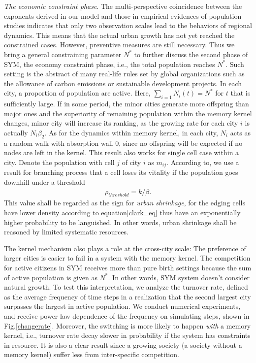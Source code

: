 \documentclass[reprint,unsortedaddress,amsmath,amssymb,aps,prl,showkeys]{revtex4-2}
\begin{document}
\textit{The economic constraint phase}. The multi-perspective coincidence between the exponents derived in our model and those in empirical evidences of population studies indicates that only two observation scales lead to the behaviors of regional dynamics. This means that the actual urban growth has not yet reached the constrained cases. However, preventive measures are still necessary. Thus we bring a general constraining parameter $N^*$ to further discuss the second phase of SYM, the economy constraint phase, i.e., the total population reaches $N^*$. Such setting is the abstract of many real-life rules set by global organizations such as the allowance of carbon emissions or sustainable development projects. In each city, a proportion of population are active. Here, $\sum_{i=1} N_i(t) = N^*$ for $t$ that is sufficiently large. If in some period, the minor cities generate more offspring than major ones and the superiority of remaining population within the memory kernel changes, minor city will increase its ranking, as the growing rate for each city $i$ is actually $N_i\beta_2$. As for the dynamics within memory kernel, in each city, $N_i$ acts as a random walk with absorption wall $0$, since no offspring will be expected if no nodes are left in the kernel. This result also works for single cell case within a city. Denote the population with cell $j$ of city $i$ as $m_{ij}$. According to\@\cite{durrett1999essentials}, we use a result for branching process that a cell loses its vitality if the population goes downhill under a threshold \begin{align}\rho_{threshold} = k/\beta.\end{align} This value shall be regarded as the sign for \emph{urban shrinkage}, for the edging cells have lower density according to equation\@\ref{clark_eq} thus have an exponentially higher probability to be languished. In other words, urban shrinkage shall be reasoned by limited systematic resources. 

The kernel mechanism also plays a role at the cross-city scale: The preference of larger cities is easier to fail in a system with the memory kernel. The competition for active citizens in SYM receives more than pure birth settings because the sum of active population is given as $N^*$. In other words, SYM system doesn't consider natural growth. To test this interpretation, we analyze the turnover rate, defined as the average frequency of time steps in a realization that the second largest city surpasses the largest in active population. We conduct numerical experiments, and receive power law dependence of the frequency on simulating steps, shown in Fig.\@\ref{changerate}. Moreover, the switching is more likely to happen \textit{with} a memory kernel, i.e., turnover rate decay slower in probability if the system has constraints in resource. It is also a clear result since a growing society (a society without a memory kernel) suffer less from inter-specific competition.
\end{document}
